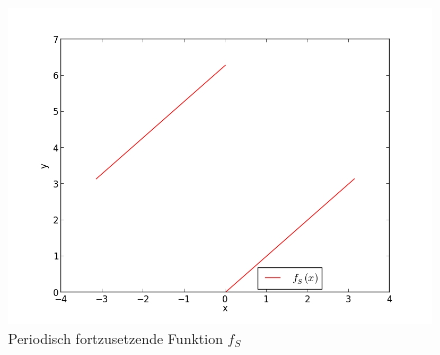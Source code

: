 	\begin{figure}[h]
		\begin{center}
		\includegraphics[scale=0.42]{picfsage.jpg}
		\caption{Periodisch fortzusetzende Funktion $f_S$}
		\label{picfsage}
		\end{center}	
	\end{figure}